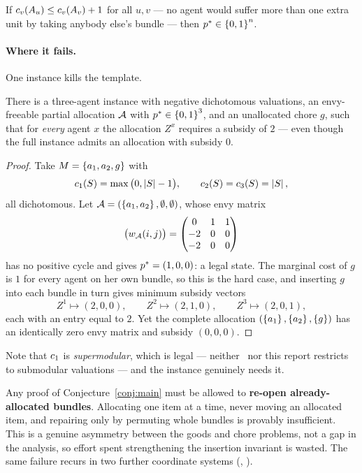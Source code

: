 \begin{corollary}
\label{cor:onestep}
If $c_v(A_{u}) \le c_v(A_{v}) + 1$ for all $u,v$ --- no agent
would suffer more than one extra unit by taking anybody else's bundle --- then
$p^{*} \in \left\{0,1\right\}^n$.
\end{corollary}

\paragraph{Where it fails.} One instance kills the template.

\begin{theorem}
\label{thm:obstruction}
There is a three-agent instance with negative dichotomous valuations, an
envy-freeable partial allocation $\mathcal{A}$ with $p^{*} \in \left\{0,1\right\}^3$, and
an unallocated chore $g$, such that for \emph{every} agent $x$ the allocation
$Z^x$ requires a subsidy of $2$ --- even though the full instance admits an
allocation with subsidy $0$.
\end{theorem}

\begin{proof}
Take $M = \left\{a_1, a_2, g\right\}$ with
\[
  c_1(S) = \max\big(0, \left\lvert S\right\rvert - 1\big), \qquad
  c_2(S) = c_3(S) = \left\lvert S\right\rvert,
\]
all dichotomous. Let $\mathcal{A} = (\left\{a_1,a_2\right\}, \emptyset, \emptyset)$, whose envy
matrix
\[
  \big(w_{\mathcal{A}}(i,j)\big) =
  \begin{pmatrix} 0 & 1 & 1 \\ -2 & 0 & 0 \\ -2 & 0 & 0 \end{pmatrix}
\]
has no positive cycle and gives $p^{*} = (1,0,0)$: a legal state. The
marginal cost of $g$ is $1$ for every agent on her own bundle, so this is the
hard case, and inserting $g$ into each bundle in turn gives minimum subsidy
vectors
\[
  Z^1 \mapsto (2,0,0), \qquad Z^2 \mapsto (2,1,0), \qquad Z^3 \mapsto (2,0,1),
\]
each with an entry equal to $2$. Yet the complete allocation
$(\left\{a_1\right\}, \left\{a_2\right\}, \left\{g\right\})$ has an identically zero envy matrix and
subsidy $(0,0,0)$.
\end{proof}

Note that $c_1$ is \emph{supermodular}, which is legal --- neither~\cite{BKNS22}
nor this report restricts to submodular valuations --- and the instance genuinely
needs it.

\begin{remark}[Verdict]
\label{rem:deadend}
Any proof of Conjecture~\ref{conj:main} must be allowed to \textbf{re-open
already-allocated bundles}. Allocating one item at a time, never moving an
allocated item, and repairing only by permuting whole bundles is provably
insufficient. This is a genuine asymmetry between the goods and chore problems,
not a gap in the analysis, so effort spent strengthening the insertion invariant
is wasted. The same failure recurs in two further coordinate systems
(, ).
\end{remark}
